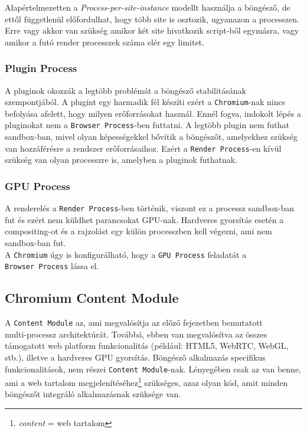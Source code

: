 \documentclass[12pt]{report}
\begin{document}
Alapértelmezetten a \textit{Process-per-site-instance} modellt használja a böngésző, de
ettől függetlenül előfordulhat, hogy több site is osztozik, ugyanazon a processzen.
Erre vagy akkor van szükség amikor két site hivatkozik script-ből egymásra,
vagy amikor a futó render processzek száma elér egy limitet.
\cite{bib-chromium-process-models}

\subsubsection{Plugin Process}
A pluginok okozzák a legtöbb problémát a böngésző stabilitásának szempontjából. A plugint
egy harmadik fél készíti ezért a \texttt{Chromium}-nak nincs befolyása afelett, hogy milyen
erőforrásokat használ. Ennél fogva, indokolt lépés a pluginokat nem a
\texttt{Browser Process}-ben futtatni. A legtöbb plugin nem futhat sandbox-ban, mivel olyan
képességekkel bővítik a böngészőt, amelyekhez szükség van hozzáférésre a rendszer
erőforrásaihoz. Ezért a \texttt{Render Process}-en kívül szükség van olyan processzre is,
amelyben a pluginok futhatnak.
\cite{bib-chromium-plugins}

\subsubsection{GPU Process}
A renderelés a \texttt{Render Process}-ben történik, viszont ez a processz
sandbox-ban fut és ezért nem küldhet parancsokat GPU-nak. Hardveres gyorsítás esetén
a compositing-ot és a rajzolást egy külön processzben kell végezni, ami nem sandbox-ban fut.
\cite{bib-chromium-gpu} \\
A \texttt{Chromium} úgy is konfigurálható, hogy a \texttt{GPU Process} feladatát a \\
\texttt{Browser Process} lássa el.


\subsection{Chromium Content Module}
A \texttt{Content Module} az, ami megvalósítja az előző fejezetben bemutatott \\
multi-processz architektúrát. Továbbá, ebben van megvalósítva az összes támogatott
web platform funkcionalitás (például: HTML5, WebRTC, WebGL, stb.), illetve
a hardveres GPU gyorsítás. Böngésző alkalmazás specifikus funkcionalitások, nem részei
\texttt{Content Module}-nak. Lényegében csak az van benne, ami a web tartalom
megjelenítéséhez\footnote{\textit{content} = web tartalom} szükséges, azaz olyan kód,
amit minden böngészőt integráló alkalmazásnak szüksége van.
\cite{bib-chromium-content-module}
\end{document}
